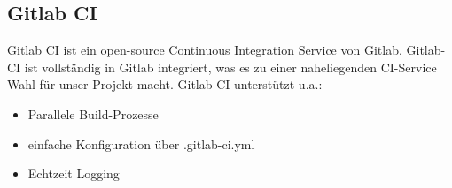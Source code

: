 \subsection{Gitlab CI}
Gitlab CI ist ein open-source Continuous Integration Service von Gitlab. Gitlab-CI ist vollständig in Gitlab integriert, was es zu einer naheliegenden CI-Service Wahl für unser Projekt macht.
Gitlab-CI unterstützt u.a.:
\begin{itemize}
	\item Parallele Build-Prozesse
	\item einfache Konfiguration über .gitlab-ci.yml
	\item Echtzeit Logging
\end{itemize}
\cite{gitlabciwiki}